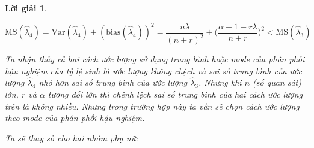 \documentclass[14pt, a4paper]{article}
\theoremstyle{sltheorem}
\theoremstyle{soltheorem}
\newtheorem*{loigiai}{Lời giải}
\begin{document}
\begin{loigiai}
\begin{enumerate}
\begin{itemize}
            \begin{equation*}
                \text{MS}(\hat{\lambda}_4) = \text{Var}(\hat{\lambda}_4) + (\text{bias}(\hat{\lambda}_4))^2 = \dfrac{n\lambda}{(n+r)^2} + \Big( \dfrac{\alpha - 1 - r\lambda}{n + r} \Big)^2 < \text{MS}(\hat{\lambda}_3)
            \end{equation*}

            Ta nhận thấy cả hai cách ước lượng sử dụng trung bình hoặc mode của phân phối hậu nghiệm của tỷ lệ sinh là ước lượng không chệch và sai số trung bình của ước lượng $\hat{\lambda}_4$ nhỏ hơn sai số trung bình của ước lượng $\hat{\lambda}_3$.
            Nhưng khi $n$ (số quan sát) lớn, $r$ và $\alpha$ tương đối lớn thì chênh lệch sai số trung bình của hai cách ước lượng trên là không nhiều.
            Nhưng trong trường hợp này ta vẫn sẽ chọn cách ước lượng theo mode của phân phối hậu nghiệm.

        \end{itemize}

        Ta sẽ thay số cho hai nhóm phụ nữ:


\end{enumerate}
\end{loigiai}
\end{document}
